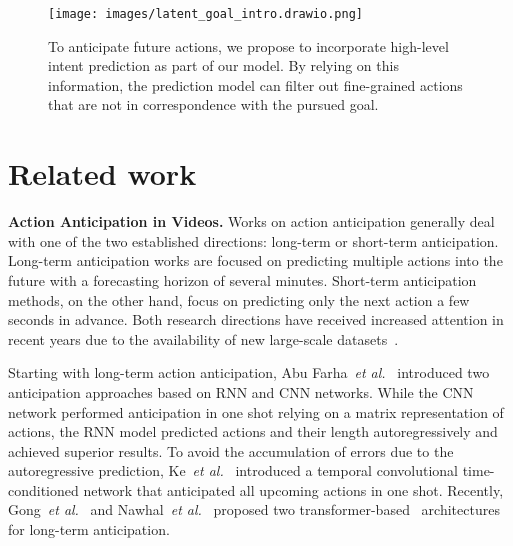 \documentclass{article}
\newcommand{\etal}[1]{\textit{et al}\onedot}
\def\etal{\emph{et al.}}
\begin{document}
\begin{figure}[t!]
\begin{minipage}[b]{0.5\linewidth}
  \centering
  \texttt{[image: images/latent\_goal\_intro.drawio.png]}
\end{minipage}
\caption{\small To anticipate future actions, we propose to incorporate high-level intent prediction as part of our model. By relying on this information, the prediction model can filter out fine-grained actions that are not in correspondence with the pursued goal.}
\label{fig:intro}
\end{figure}


\vspace{-0.4cm}
\section{Related work}
\label{sec:related_work}

\textbf{Action Anticipation in Videos.} Works on action anticipation generally deal with one of the two established directions: long-term or short-term anticipation. Long-term anticipation works are focused on predicting multiple actions into the future with a forecasting horizon of several minutes. Short-term anticipation methods, on the other hand, focus on predicting only the next action a few seconds in advance. Both research directions have received increased attention in recent years due to the availability of new large-scale datasets~\cite{ Damen2021PAMI, sener2022assembly101, yin2018eye}.

Starting with long-term action anticipation, Abu Farha~\etal~\cite{Farha_2018_CVPR} introduced two anticipation approaches based on RNN and CNN networks. While the CNN network performed anticipation in one shot relying on a matrix representation of actions, the RNN model predicted actions and their length autoregressively and achieved superior results.
To avoid the accumulation of errors due to the autoregressive prediction, Ke~\etal~\cite{Ke_2019_CVPR} introduced a temporal convolutional time-conditioned network that anticipated all upcoming actions in one shot. Recently, Gong~\etal~\cite{gong2022future} and Nawhal~\etal~\cite{nawhal2022anticipatr} proposed two transformer-based~\cite{vaswani2017attention} architectures for long-term anticipation.
\end{document}
